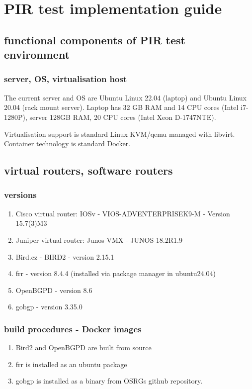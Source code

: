 \section{PIR test implementation guide}

\subsection{functional components of PIR test environment}

\subsubsection{server, OS, virtualisation host}

The current server and OS are Ubuntu Linux 22.04 (laptop) and Ubuntu Linux 20.04 (rack mount server).
Laptop has 32 GB RAM and 14 CPU cores (Intel i7-1280P), server 128GB RAM, 20 CPU cores (Intel Xeon D-1747NTE).

Virtualisation support is standard Linux KVM/qemu managed with libvirt.
Container technology is standard Docker.

\subsection{virtual routers, software routers}
\subsubsection{versions}

\begin{enumerate}
\item Cisco virtual router: IOSv - VIOS-ADVENTERPRISEK9-M - Version 15.7(3)M3
\item Juniper virtual router: Junos VMX - JUNOS 18.2R1.9
\item Bird.cz - BIRD2 - version 2.15.1
\item frr - version 8.4.4 (installed via package manager in ubuntu24.04)
\item OpenBGPD - version 8.6
\item gobgp - version 3.35.0
\end{enumerate}

\subsubsection{build procedures - Docker images}

\begin{enumerate}
\item Bird2 and OpenBGPD are built from source
\item frr is installed as an ubuntu package
\item gobgp is installed as a binary from OSRGs github repository.
\end{enumerate}


